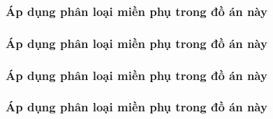 


















\subsubsection{Áp dụng phân loại miền phụ trong đồ án này}

\subsubsection{Áp dụng phân loại miền phụ trong đồ án này}

\subsubsection{Áp dụng phân loại miền phụ trong đồ án này}

\subsubsection{Áp dụng phân loại miền phụ trong đồ án này}

